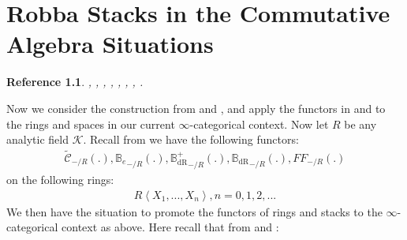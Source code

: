 \documentclass[12pt]{book}
\newtheorem{reference}{Reference}
\begin{document}
\chapter{Robba Stacks in the Commutative Algebra Situations}

\begin{reference}
\cite{KL1}, \cite{KL2}, \cite{Sch1}, \cite{Sch}, \cite{Fon}, \cite{FF}, \cite{F1}, \cite{Ta}.
\end{reference}




Now we consider the construction from \cite{KL1} and \cite{KL2}, and apply the functors in \cite[Definition 9.3.3, Definition 9.3.5, Definition 9.3.11, Definition 9.3.9]{KL1} and \cite{KL2} to the rings and spaces in our current $\infty$-categorical context. Now let $R$ be any analytic field $\mathcal{K}$. Recall from \cite[Definition 9.3.3, Definition 9.3.5, Definition 9.3.11, Definition 9.3.9]{KL1} we have the following functors:
\begin{align}
\widetilde{\mathcal{C}}_{-/R}(.),{\mathbb{B}_e}_{-/R}(.),{\mathbb{B}_\mathrm{dR}^+}_{-/R}(.),{\mathbb{B}_\mathrm{dR}}_{-/R}(.),{FF}_{-/R}(.)	
\end{align}
on the following rings:
\begin{align}
R\left<X_1,...,X_n\right>,n=0,1,2,...	
\end{align}
We then have the situation to promote the functors of rings and stacks to the $\infty$-categorical context as above. Here recall that from \cite[Definition 9.3.3, Definition 9.3.5, Definition 9.3.11, Definition 9.3.9]{KL1} and \cite{KL2}:
\end{document}
